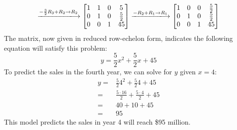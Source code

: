 \documentclass{article}
\begin{document}
$$\xlongrightarrow{-\frac{3}{2}R_3+R_2\rightarrow R_2}\begin{bmatrix}1&1&0&5\\0&1&0&\frac{5}{2}\\0&0&1&45\end{bmatrix}\xlongrightarrow{-R_2+R_1\rightarrow R_1}\begin{bmatrix}1&0&0&\frac{5}{2}\\0&1&0&\frac{5}{2}\\0&0&1&45\end{bmatrix}$$
The matrix, now given in reduced row-echelon form, indicates the following equation will satisfy this problem:
$$y=\frac{5}{2}x^2+\frac{5}{2}x+45$$
To predict the sales in the fourth year, we can solve for $y$ given $x=4$:
\begin{align*}
y=&\frac{5}{2}4^2+\frac{5}{2}4+45\\
=&\frac{5\cdot16}{2}+\frac{5\cdot4}{2}+45\\
=&40+10+45\\
=&95
\end{align*}
This model predicts the sales in year 4 will reach \$95 million.
\newpage
\end{document}
